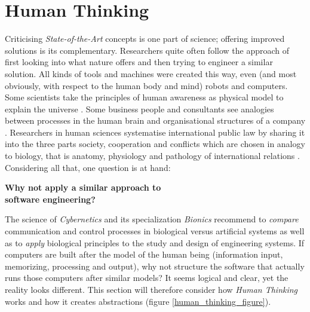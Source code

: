%
%
%
%
%
%
%

\section{Human Thinking}
\label{human_thinking_heading}

Criticising \emph{State-of-the-Art} concepts is one part of science; offering
improved solutions is its complementary.
Researchers quite often follow the approach of first looking into what nature
offers and then trying to engineer a similar solution. All kinds of tools and
machines were created this way, even (and most obviously, with respect to the
human body and mind) robots and computers. Some scientists take the principles
of human awareness as physical model to explain the universe \cite{ripota}.
Some business people and consultants see analogies between processes in the
human brain and organisational structures of a company \cite{schoenhofer}.
Researchers in human sciences systematise international public law by sharing it
into the three parts society, cooperation and conflicts which are chosen in analogy
to biology, that is anatomy, physiology and pathology of international relations
\cite{bierzanek}. Considering all that, one question is at hand:

\begin{center}
    \textbf{Why not apply a similar approach to\\
    software engineering?}
\end{center}

The science of \emph{Cybernetics} and its specialization \emph{Bionics} recommend
to \emph{compare} communication and control processes in biological versus
artificial systems as well as to \emph{apply} biological principles to the
study and design of engineering systems. If computers are built after the model of
the human being (information input, memorizing, processing and output), why not
structure the software that actually runs those computers after similar models?
It seems logical and clear, yet the reality looks different. This section will
therefore consider how \emph{Human Thinking} works and how it creates abstractions
(figure \ref{human_thinking_figure}).

